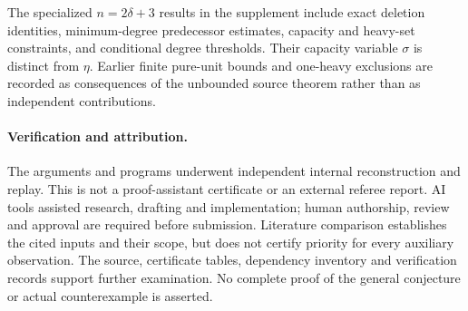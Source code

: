 The specialized $n=2\delta+3$ results in the supplement include exact
deletion identities, minimum-degree predecessor estimates, capacity and
heavy-set constraints, and conditional degree thresholds. Their capacity
variable $\sigma$ is distinct from $\eta$. Earlier finite pure-unit bounds
and one-heavy exclusions are recorded as consequences of the unbounded
source theorem rather than as independent contributions.

\paragraph{Verification and attribution.}
The arguments and programs underwent independent internal reconstruction
and replay. This is not a proof-assistant certificate or an external referee
report. AI tools assisted research, drafting and implementation; human
authorship, review and approval are required before submission. Literature
comparison establishes the cited inputs and their scope, but does not certify
priority for every auxiliary observation. The source, certificate tables,
dependency inventory and verification records support further examination.
No complete proof of the general conjecture or actual counterexample is asserted.
